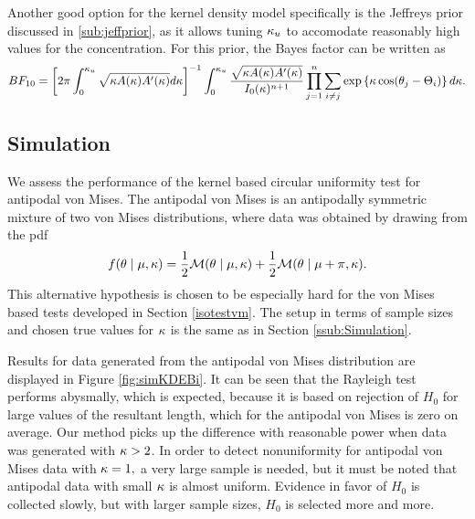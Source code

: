 Another good option for the kernel density model specifically is the Jeffreys prior discussed in \ref{sub:jeffprior}, as it allows tuning \( \kappa_u \) to accomodate reasonably high values for the concentration. For this prior, the Bayes factor can be written as
\begin{equation}
 BF_{10} = \left[ 2 \pi \int_0^{\kappa_u} \sqrt{\kappa A(\kappa) A'(\kappa)} d\kappa \right]^{-1}  \int_0^{\kappa_u} \frac{\sqrt{\kappa A(\kappa) A'(\kappa) } }{I_0(\kappa)^{n+1} } \prod_{j = 1}^n \sum_{i \neq j }  \exp \left\{ \kappa \cos(\theta_j - \Theta_i) \right\} d\kappa.
\end{equation}

\subsection{Simulation}

We assess the performance of the kernel based circular uniformity test for antipodal von Mises. The antipodal von Mises is an antipodally symmetric mixture of two von Mises distributions, where data was obtained by drawing from the pdf
\begin{equation}
  f(\theta \mid \mu, \kappa) = \frac{1}{2} \mathcal{M} (\theta \mid \mu, \kappa) + \frac{1}{2} \mathcal{M} (\theta \mid \mu + \pi, \kappa).
\end{equation}
This alternative hypothesis is chosen to be especially hard for the von Mises based tests developed in Section \ref{isotestvm}. The setup in terms of sample sizes and chosen true values for \( \kappa \) is the same as in Section \ref{ssub:Simulation}.

Results for data generated from the antipodal von Mises distribution are displayed in Figure \ref{fig:simKDEBi}. It can be seen that the Rayleigh test performs abysmally, which is expected, because it is based on rejection of \( H_0 \) for large values of the resultant length, which for the antipodal von Mises is zero on average. Our method picks up the difference with reasonable power when data was generated with \( \kappa > 2 \). In order to detect nonuniformity for antipodal von Mises data with \( \kappa = 1, \) a very large sample is needed, but it must be noted that antipodal data with small \( \kappa \) is almost uniform. Evidence in favor of \( H_0 \) is collected slowly, but with larger sample sizes, \( H_0 \) is selected more and more.




